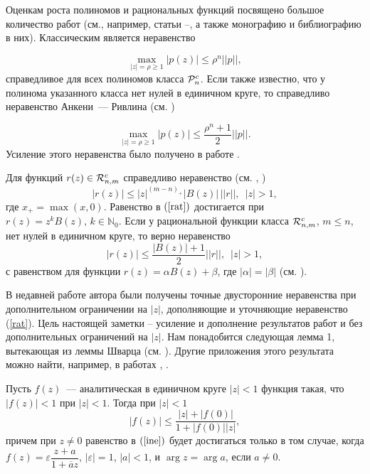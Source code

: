 \documentclass[a4paper,12pt,twoside]{article}
\begin{document}
Оценкам роста полиномов и рациональных функций посвящено большое
количество работ (см., например, статьи \cite{Ank}--\cite{ShLi},
а также монографию \cite[глава 12]{Rah02} и библиографию в них).
Классическим является неравенство


$$
\max\limits_{|z|=\rho\ge1}|p(z)|\leq \rho^n||p||,
$$
справедливое для всех полиномов класса ${\cal P}_n^c$. Если также
известно, что у полинома указанного класса нет нулей в единичном
круге, то справедливо неравенство Анкени~--- Ривлина (см.
\cite{Ank})

$$
\max\limits_{|z|=\rho\ge1}|p(z)|\leq \frac{\rho^n+1}{2}||p||.
$$
Усиление этого неравенства было получено в работе \cite{Dub01}.

Для функций $r(z)\in {\cal R}_{n,m}^c$ справедливо неравенство
(см. \cite{Gov}, \cite{Gon})
\begin{equation}\label{rat} |r(z)|\leq |z|^{(m-n)_{+}} |B(z)|\,||r||, \, \, \,
|z|>1,
\end{equation}
где $x_{+}=\max(x,0)$. Равенство в $(\ref{rat})$ достигается при
$r(z)=z^kB(z), \, k\in \mathbb{N}_0$. Если у рациональной функции
класса ${\cal R}_{n,m}^c$, $m\leq n$,  нет нулей в единичном
круге, то верно  неравенство
\begin{equation}\label{ranri}
 |r(z)|\leq \frac{|B(z)|+1}{2}||r||, \, \,
\, |z|>1,
\end{equation}
с равенством для функции $r(z)=\alpha B(z)+\beta$, где
$|\alpha|=|\beta|$ (см. \cite{Gov}).

В недавней работе автора \cite{Kalm} были получены точные
двусторонние неравенства при дополнительном ограничении на $|z|$,
дополняющие и уточняющие неравенство (\ref{rat}). Цель настоящей
заметки -- усиление и дополнение результатов работ \cite{Gov} и
\cite{Kalm} без дополнительных ограничений на $|z|$. Нам
понадобится следующая лемма 1, вытекающая из леммы Шварца (см.
\cite[стр. 320]{Gol}). Другие приложения этого результата можно
найти, например, в работах \cite{Dub01}, \cite{GovRah}.

\begin{lem} Пусть $f(z)$~--- аналитическая в единичном круге $|z|<1$ функция
такая, что $|f(z)|< 1$ при $|z|<1$. Тогда при $|z|<1$
\begin{equation}\label{ine}
|f(z)|\leq\frac{|z|+|f(0)|}{1+|f(0)||z|},
\end{equation}
причем при $z\ne0$ равенство в $(\ref{ine})$ будет достигаться
только в том случае, когда $f(z)=\varepsilon
\dfrac{z+a}{1+\overline{a}z}$, $|\varepsilon|=1$, $|a|<1$, и $\arg
z=\arg a$, если $a\ne 0$.
\end{lem}
\end{document}
